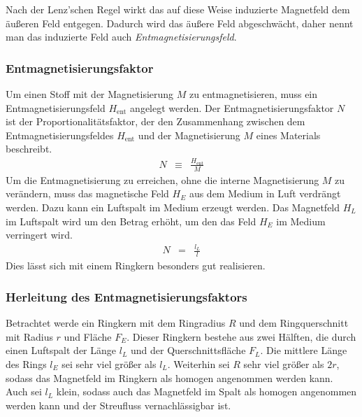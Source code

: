 \documentclass[12pt,a4paper]{scrartcl}
\numberwithin{equation}{section} %
\renewcommand{\[}{} %
\renewcommand{\]}{\noindent} %
\begin{document}
Nach der Lenz'schen Regel wirkt das auf diese Weise induzierte Magnetfeld dem äußeren Feld entgegen. Dadurch wird das äußere Feld abgeschwächt, daher nennt man das induzierte Feld auch \emph{Entmagnetisierungsfeld}.

\hypertarget{entmagnetisierungsfaktor}{%
\subsubsection{Entmagnetisierungsfaktor}\label{entmagnetisierungsfaktor}}
Um einen Stoff mit der Magnetisierung \(M\) zu entmagnetisieren, muss ein Entmagnetisierungsfeld \(H_\mathrm{ent}\) angelegt werden. Der Entmagnetisierungsfaktor \(N\) ist der Proportionalitätsfaktor, der den Zusammenhang zwischen dem Entmagnetisierungsfeldes \(H_\mathrm{ent}\) und der Magnetisierung \(M\) eines Materials beschreibt.
\begin{eqnarray}
    N &\equiv& \frac{H_\mathrm{ent}}{M} \label{defN}
\end{eqnarray}
Um die Entmagnetisierung zu erreichen, ohne die interne Magnetisierung \(M\) zu verändern, muss das magnetische Feld \(H_E\) aus dem Medium in Luft verdrängt werden. Dazu kann ein Luftspalt im Medium erzeugt werden. Das Magnetfeld \(H_L\) im Luftspalt wird um den Betrag erhöht, um den das Feld \(H_E\) im Medium verringert wird.
\begin{eqnarray}
    N &=& \frac{l_L}{l} \label{N}
\end{eqnarray}
Dies lässt sich mit einem Ringkern besonders gut realisieren.

\hypertarget{herleitung-des-entmagnetisierungsfaktors}{%
\subsubsection{Herleitung des Entmagnetisierungsfaktors}\label{herleitung-des-entmagnetisierungsfaktors}}
Betrachtet werde ein Ringkern mit dem Ringradius \(R\) und dem Ringquerschnitt mit Radius \(r\) und Fläche \(F_E\). Dieser Ringkern bestehe aus zwei Hälften, die durch einen Luftspalt der Länge \(l_L\) und der Querschnittsfläche \(F_L\). Die mittlere Länge des Rings \(l_E\) sei sehr viel größer als \(l_L\). Weiterhin sei \(R\) sehr viel größer als \(2r\), sodass das Magnetfeld im Ringkern als homogen angenommen werden kann. Auch sei \(l_L\) klein, sodass auch das Magnetfeld im Spalt als homogen angenommen werden kann und der Streufluss vernachlässigbar ist.
\end{document}
